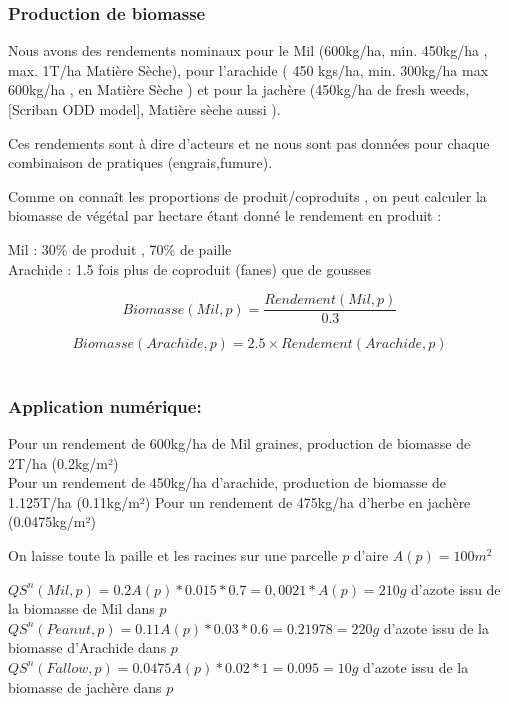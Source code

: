\documentclass[10pt,a4paper,french]{article} %
\begin{document}
\subsubsection{Production de biomasse}


Nous avons des rendements nominaux pour le Mil (600kg/ha, min. 450kg/ha , max. 1T/ha Matière Sèche), pour l'arachide ( 450 kgs/ha, min. 300kg/ha max 600kg/ha , en Matière Sèche ) et pour la jachère (450kg/ha de fresh weeds, [Scriban ODD model], Matière sèche aussi  ).

Ces rendements sont à dire d'acteurs et ne nous sont pas données pour chaque combinaison de pratiques (engrais,fumure).

Comme on connaît les proportions de  produit/coproduits , on peut calculer la biomasse de végétal par hectare étant donné le rendement en produit : 

Mil : 30\% de produit ,  70\% de paille \\
Arachide : 1.5 fois plus de coproduit (fanes) que de gousses

\begin{equation}
Biomasse(Mil,p) =  \frac{Rendement(Mil,p)}{0.3}
\end{equation}

\begin{equation}
Biomasse(Arachide,p) =  2.5 \times Rendement(Arachide,p)
\end{equation}\\





\subsubsection{Application numérique:} 

Pour un rendement de 600kg/ha de Mil graines, production de biomasse de 2T/ha (0.2kg/m²)\\
Pour un rendement de 450kg/ha d'arachide, production de biomasse de 1.125T/ha (0.11kg/m²)
Pour un rendement de 475kg/ha d'herbe en jachère (0.0475kg/m²) 



On laisse toute la paille et les racines sur une parcelle $p$ d'aire $A(p)=100m^2$


$QS^{n}(Mil, p)= 0.2 A(p)* 0.015 * 0.7 = 0,0021* A(p)= 210g$ d'azote issu de la biomasse de Mil dans $p$ \\
$QS^{n}(Peanut, p)= 0.11 A(p) * 0.03 * 0.6 = 0.21978 = 220g$ d'azote issu de la biomasse d'Arachide  dans $p$\\
$QS^{n}(Fallow, p)= 0.0475 A(p)* 0.02 * 1 = 0.095 = 10g$ d'azote issu de la biomasse de jachère  dans $p$ \\
\end{document}
